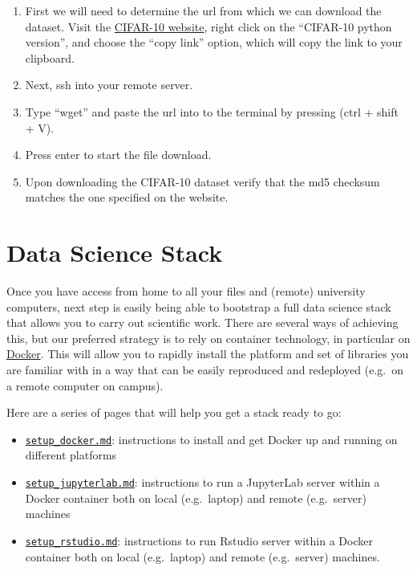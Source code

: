 \documentclass[
]{book}
\providecommand{\tightlist}{%
  \setlength{\itemsep}{0pt}\setlength{\parskip}{0pt}}
\begin{document}
\begin{enumerate}
\def\labelenumi{\arabic{enumi})}
\tightlist
\item
  First we will need to determine the url from which we can download the dataset.
  Visit the \href{https://www.cs.toronto.edu/~kriz/cifar.html}{CIFAR-10 website}, right
  click on the ``CIFAR-10 python version'', and choose the ``copy link'' option,
  which will copy the link to your clipboard.
\item
  Next, ssh into your remote server.
\item
  Type ``wget'' and paste the url into to the terminal by pressing (ctrl + shift + V).
\item
  Press enter to start the file download.
\item
  Upon downloading the CIFAR-10 dataset verify that the md5 checksum matches the one specified on the website.
\end{enumerate}

\hypertarget{data-science-stack}{%
\chapter{Data Science Stack}\label{data-science-stack}}

Once you have access from home to all your files and (remote) university computers, next step is easily being able to bootstrap a full data science stack that allows you to carry out scientific work. There are several ways of achieving this, but our preferred strategy is to rely on container technology, in particular on \href{https://www.docker.com/}{Docker}. This will allow you to rapidly install the platform and set of libraries you are familiar with in a way that can be easily reproduced and redeployed (e.g.~on a remote computer on campus).

Here are a series of pages that will help you get a stack ready to go:

\begin{itemize}
\tightlist
\item
  \href{06_docker.md}{\texttt{setup\_docker.md}}: instructions to install and get Docker
  up and running on different platforms
\item
  \href{07_jupyterlab.md}{\texttt{setup\_jupyterlab.md}}: instructions to run a JupyterLab server within a Docker container both on local (e.g.~laptop) and remote (e.g.~server) machines
\item
  \href{08_RStudio.md}{\texttt{setup\_rstudio.md}}: instructions to run Rstudio server within a Docker container both on local (e.g.~laptop) and remote (e.g.~server) machines.
\end{itemize}
\end{document}

